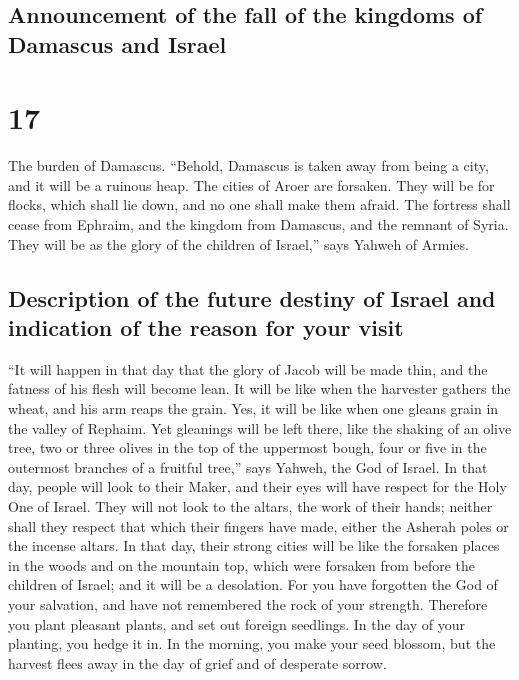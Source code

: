 \hypertarget{announcement-of-the-fall-of-the-kingdoms-of-damascus-and-israel}{%
\subsection{Announcement of the fall of the kingdoms of Damascus and
Israel}\label{announcement-of-the-fall-of-the-kingdoms-of-damascus-and-israel}}

\hypertarget{section-16}{%
\section{17}\label{section-16}}

 The burden of Damascus. ``Behold, Damascus is taken away
from being a city, and it will be a ruinous heap.  The
cities of Aroer are forsaken. They will be for flocks, which shall lie
down, and no one shall make them afraid.  The fortress
shall cease from Ephraim, and the kingdom from Damascus, and the remnant
of Syria. They will be as the glory of the children of Israel,'' says
Yahweh of Armies.

\hypertarget{description-of-the-future-destiny-of-israel-and-indication-of-the-reason-for-your-visit}{%
\subsection{Description of the future destiny of Israel and indication
of the reason for your
visit}\label{description-of-the-future-destiny-of-israel-and-indication-of-the-reason-for-your-visit}}

 ``It will happen in that day that the glory of Jacob will
be made thin, and the fatness of his flesh will become lean.
 It will be like when the harvester gathers the wheat, and
his arm reaps the grain. Yes, it will be like when one gleans grain in
the valley of Rephaim.  Yet gleanings will be left there,
like the shaking of an olive tree, two or three olives in the top of the
uppermost bough, four or five in the outermost branches of a fruitful
tree,'' says Yahweh, the God of Israel.  In that day,
people will look to their Maker, and their eyes will have respect for
the Holy One of Israel.  They will not look to the altars,
the work of their hands; neither shall they respect that which their
fingers have made, either the Asherah poles or the incense altars.
 In that day, their strong cities will be like the
forsaken places in the woods and on the mountain top, which were
forsaken from before the children of Israel; and it will be a
desolation.  For you have forgotten the God of your
salvation, and have not remembered the rock of your strength. Therefore
you plant pleasant plants, and set out foreign seedlings.
 In the day of your planting, you hedge it in. In the
morning, you make your seed blossom, but the harvest flees away in the
day of grief and of desperate sorrow.

